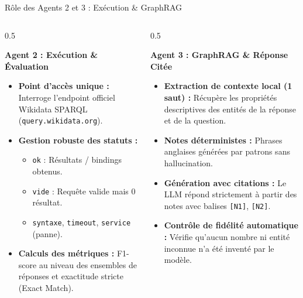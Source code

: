 \documentclass[10pt,aspectratio=169]{beamer}
\begin{document}
\begin{frame}{Rôle des Agents 2 et 3 : Exécution \& GraphRAG}
  \begin{columns}
    \begin{column}{0.5\textwidth}
      \begin{block}{\textbf{Agent 2 : Exécution \& Évaluation}}
        \begin{itemize}
          \item \textbf{Point d'accès unique :} Interroge l'endpoint officiel Wikidata SPARQL (\texttt{query.wikidata.org}).
          \item \textbf{Gestion robuste des statuts :}
            \begin{itemize}
              \item \texttt{ok} : Résultats / bindings obtenus.
              \item \texttt{vide} : Requête valide mais 0 résultat.
              \item \texttt{syntaxe}, \texttt{timeout}, \texttt{service} (panne).
            \end{itemize}
          \item \textbf{Calculs des métriques :} F1-score au niveau des ensembles de réponses et exactitude stricte (Exact Match).
        \end{itemize}
      \end{block}
    \end{column}
    \begin{column}{0.5\textwidth}
      \begin{block}{\textbf{Agent 3 : GraphRAG \& Réponse Citée}}
        \begin{itemize}
          \item \textbf{Extraction de contexte local (1 saut) :} Récupère les propriétés descriptives des entités de la réponse et de la question.
          \item \textbf{Notes déterministes :} Phrases anglaises générées par patrons sans hallucination.
          \item \textbf{Génération avec citations :} Le LLM répond strictement à partir des notes avec balises \texttt{[N1]}, \texttt{[N2]}.
          \item \textbf{Contrôle de fidélité automatique :} Vérifie qu'aucun nombre ni entité inconnue n'a été inventé par le modèle.
        \end{itemize}
      \end{block}
    \end{column}
  \end{columns}
\end{frame}
\end{document}
